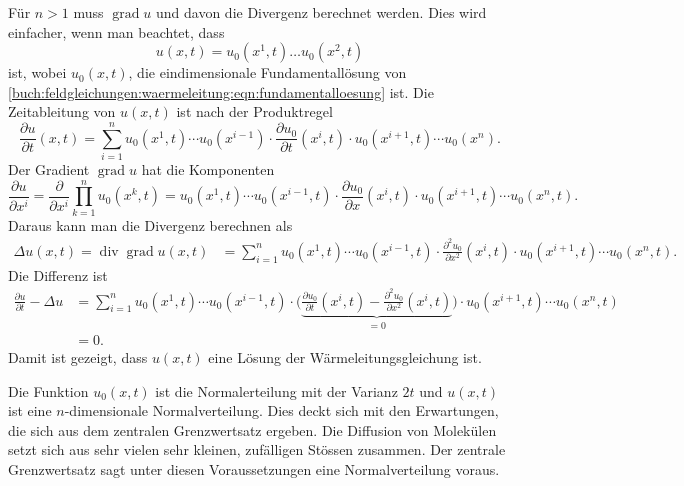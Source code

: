 Für $n>1$ muss $\operatorname{grad}u$ und davon die Divergenz
berechnet werden.
Dies wird einfacher, wenn man beachtet, dass
\[
u(x,t)
=
u_0(x^1,t)
\dots
u_0(x^2,t)
\]
ist, wobei $u_0(x,t)$, die eindimensionale Fundamentallösung
von \eqref{buch:feldgleichungen:waermeleitung:eqn:fundamentalloesung}
ist.
Die Zeitableitung von $u(x,t)$ ist nach der Produktregel
\[
\frac{\partial u}{\partial t}(x,t)
=
\sum_{i=1}^n
u_0(x^1,t)\cdots u_0(x^{i-1})
\cdot
\frac{\partial u_0}{\partial t}(x^i,t)
\cdot
u_0(x^{i+1},t)\cdots u_0(x^n).
\]
Der Gradient $\operatorname{grad}u$ hat die Komponenten
\[
\frac{\partial u}{\partial x^i}
=
\frac{\partial}{\partial x^i}
\prod_{k=1}^n
u_0(x^k,t)
=
u_0(x^1,t)\cdots u_0(x^{i-1},t)
\cdot
\frac{\partial u_0}{\partial x}(x^i,t)
\cdot
u_0(x^{i+1},t) \cdots u_0(x^n,t).
\]
Daraus kann man die Divergenz berechnen als
\begin{align*}
\Delta u(x,t)
=
\operatorname{div}
\operatorname{grad}
u(x,t)
&=
\sum_{i=1}^n
u_0(x^1,t)\cdots u_0(x^{i-1},t)
\cdot
\frac{\partial^2 u_0}{\partial x^2}(x^i,t)
\cdot
u_0(x^{i+1},t) \cdots u_0(x^n,t).
\end{align*}
Die Differenz ist
\begin{align*}
\frac{\partial u}{\partial t}
-
\Delta u
&=
\sum_{i=1}^n
u_0(x^1,t)\cdots u_0(x^{i-1},t)
\cdot
\biggl(
\underbrace{
\frac{\partial u_0}{\partial t}(x^i,t)
-
\frac{\partial^2 u_0}{\partial x^2}(x^i,t)
}_{\displaystyle = 0}
\biggr)
\cdot
u_0(x^{i+1},t) \cdots u_0(x^n,t)
\\
&=
0.
\end{align*}
Damit ist gezeigt, dass $u(x,t)$ eine Lösung der Wärmeleitungsgleichung
ist.

Die Funktion $u_0(x,t)$ ist die Normalerteilung mit der Varianz $2t$ und
$u(x,t)$ ist eine $n$-dimensionale Normalverteilung.
Dies deckt sich mit den Erwartungen, die sich aus dem zentralen
Grenzwertsatz ergeben.
Die Diffusion von Molekülen setzt sich aus sehr vielen sehr
kleinen, zufälligen Stössen zusammen.
Der zentrale Grenzwertsatz sagt unter diesen Voraussetzungen eine
Normalverteilung voraus.
